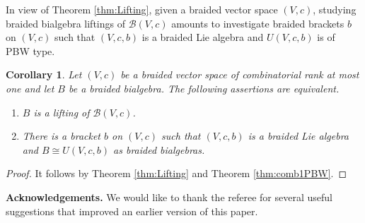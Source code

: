 \documentclass[english]{amsart}
\numberwithin{equation}{section}
\numberwithin{figure}{section}
\theoremstyle{plain}
\theoremstyle{definition}
\theoremstyle{definition}
\theoremstyle{remark}
\theoremstyle{remark}
\theoremstyle{plain}
\theoremstyle{plain}
\theoremstyle{plain}
\newtheorem{cor}[thm]{Corollary}
\begin{document}
In view of Theorem \ref{thm:Lifting}, given a braided vector space
$\left(V,c\right)$, studying braided bialgebra liftings of $\mathcal{B}\left(V,c\right)$
amounts to investigate braided brackets $b$ on $\left(V,c\right)$
such that $\left(V,c,b\right)$ is a braided Lie algebra and $U\left(V,c,b\right)$
is of PBW type. 
\begin{cor}
\label{cor:Lifting}Let $\left(V,c\right)$ be a braided vector space
of combinatorial rank at most one and let $B$ be a braided bialgebra.
The following assertions are equivalent.
\begin{enumerate}
\item $B$ is a lifting of $\mathcal{B}\left(V,c\right)$.
\item There is a bracket $b$ on $(V,c)$ such that $(V,c,b)$ is a braided
Lie algebra and $B\cong U(V,c,b)$ as braided bialgebras.
\end{enumerate}
\end{cor}
\begin{proof}
It follows by Theorem \ref{thm:Lifting} and Theorem \ref{thm:comb1PBW}.
\end{proof}

\noindent \textbf{Acknowledgements.} We would like to thank the referee for
several useful suggestions that improved an earlier version of this paper.
\end{document}
